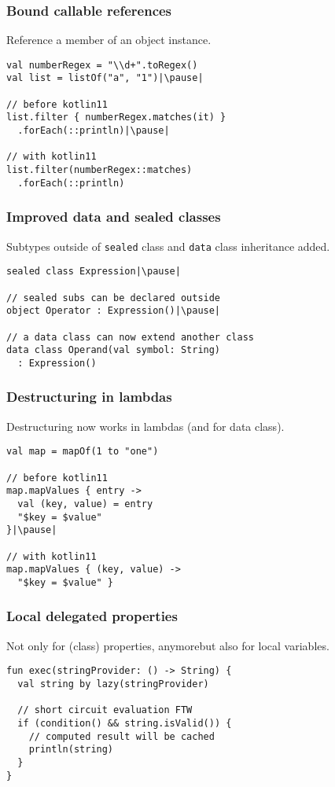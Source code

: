 
\begin{frame}[fragile] \frametitle{Bound callable references}
Reference a member of an object instance.
\begin{lstlisting}
val numberRegex = "\\d+".toRegex()
val list = listOf("a", "1")|\pause|

// before kotlin11
list.filter { numberRegex.matches(it) }
  .forEach(::println)|\pause|

// with kotlin11
list.filter(numberRegex::matches)
  .forEach(::println)
\end{lstlisting}
\end{frame}


\begin{frame}[fragile] \frametitle{Improved data and sealed classes}
Subtypes outside of \texttt{sealed} class and \texttt{data} class inheritance added.
\begin{lstlisting}
sealed class Expression|\pause|

// sealed subs can be declared outside
object Operator : Expression()|\pause|

// a data class can now extend another class
data class Operand(val symbol: String)
  : Expression()
\end{lstlisting}
\end{frame}


\begin{frame}[fragile] \frametitle{Destructuring in lambdas}
Destructuring now works in lambdas (and for data class).
\begin{lstlisting}
val map = mapOf(1 to "one")

// before kotlin11
map.mapValues { entry ->
  val (key, value) = entry
  "$key = $value"
}|\pause|

// with kotlin11
map.mapValues { (key, value) -> 
  "$key = $value" }
\end{lstlisting}
\end{frame}


\begin{frame}[fragile] \frametitle{Local delegated properties}
Not only for (class) properties, anymorebut also for local variables.
\begin{lstlisting}
fun exec(stringProvider: () -> String) {
  val string by lazy(stringProvider)
  
  // short circuit evaluation FTW
  if (condition() && string.isValid()) {
    // computed result will be cached
    println(string)
  }
}
\end{lstlisting}
\end{frame}

